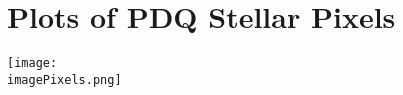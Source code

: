 % 
% 
% 
%
%

\section{Plots of PDQ Stellar Pixels}

\ifdefined \imagePixels

\begin{center}
  \texttt{[image: \\imagePixels.png]}
\end{center}

